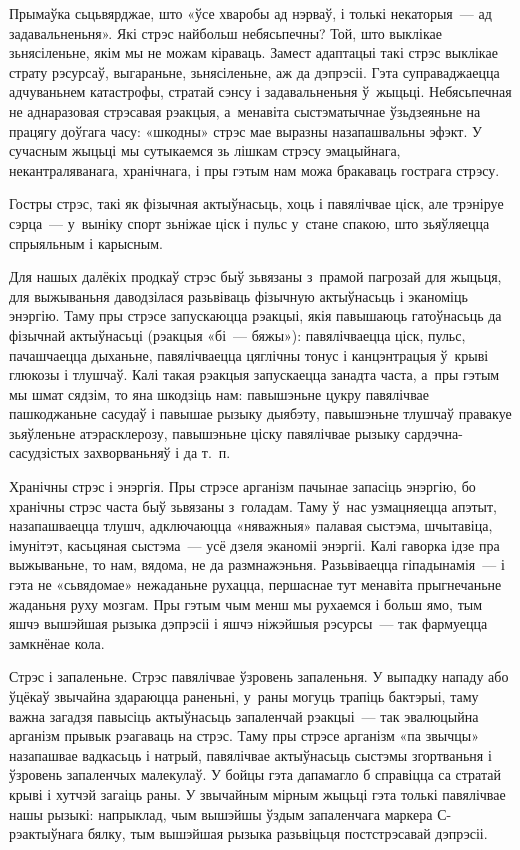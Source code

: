 Прымаўка сьцьвярджае, што «ўсе хваробы ад нэрваў, і толькі некаторыя~--- ад задавальненьня». Які стрэс найбольш небясьпечны? Той, што выклікае зьнясіленьне, якім мы не можам кіраваць. Замест адаптацыі такі стрэс выклікае страту рэсурсаў, выгараньне, зьнясіленьне, аж да дэпрэсіі. Гэта суправаджаецца адчуваньнем катастрофы, стратай сэнсу і задавальненьня ў~жыцьці. Небясьпечная не аднаразовая стрэсавая рэакцыя, а~менавіта сыстэматычнае ўзьдзеяньне на працягу доўгага часу: «шкодны» стрэс мае выразны назапашвальны эфэкт. У сучасным жыцьці мы сутыкаемся зь лішкам стрэсу эмацыйнага, некантраляванага, хранічнага, і пры гэтым нам можа бракаваць гострага стрэсу.

Гостры стрэс, такі як фізычная актыўнасьць, хоць і павялічвае ціск, але трэніруе сэрца~--- у~выніку спорт зьніжае ціск і пульс у~стане спакою, што зьяўляецца спрыяльным і карысным.

Для нашых далёкіх продкаў стрэс быў зьвязаны з~прамой пагрозай для жыцьця, для выжываньня даводзілася разьвіваць фізычную актыўнасьць і эканоміць энэргію. Таму пры стрэсе запускаюцца рэакцыі, якія павышаюць гатоўнасьць да фізычнай актыўнасьці (рэакцыя «бі~--- бяжы»): павялічваецца ціск, пульс, пачашчаецца дыханьне, павялічваецца цяглічны тонус і канцэнтрацыя ў~крыві глюкозы і тлушчаў. Калі такая рэакцыя запускаецца занадта часта, а~пры гэтым мы шмат сядзім, то яна шкодзіць нам: павышэньне цукру павялічвае пашкоджаньне сасудаў і павышае рызыку дыябэту, павышэньне тлушчаў правакуе зьяўленьне атэрасклерозу, павышэньне ціску павялічвае рызыку сардэчна-сасудзістых захворваньняў і да т.~п.

Хранічны стрэс і энэргія. Пры стрэсе арганізм пачынае запасіць энэргію, бо хранічны стрэс часта быў зьвязаны з~голадам. Таму ў~нас узмацняецца апэтыт, назапашваецца тлушч, адключаюцца «няважныя» палавая сыстэма, шчытавіца, імунітэт, касьцяная сыстэма~--- усё дзеля эканоміі энэргіі. Калі гаворка ідзе пра выжываньне, то нам, вядома, не да размнажэньня. Разьвіваецца гіпадынамія~--- і гэта не «сьвядомае» нежаданьне рухацца, першаснае тут менавіта прыгнечаньне жаданьня руху мозгам. Пры гэтым чым менш мы рухаемся і больш ямо, тым яшчэ вышэйшая рызыка дэпрэсіі і яшчэ ніжэйшыя рэсурсы~--- так фармуецца замкнёнае кола.

Стрэс і запаленьне. Стрэс павялічвае ўзровень запаленьня. У выпадку нападу або ўцёкаў звычайна здараюцца раненьні, у~раны могуць трапіць бактэрыі, таму важна загадзя павысіць актыўнасьць запаленчай рэакцыі~--- так эвалюцыйна арганізм прывык рэагаваць на стрэс. Таму пры стрэсе арганізм «па звычцы» назапашвае вадкасьць і натрый, павялічвае актыўнасьць сыстэмы згортваньня і ўзровень запаленчых малекулаў. У бойцы гэта дапамагло б справіцца са стратай крыві і хутчэй загаіць раны. У звычайным мірным жыцьці гэта толькі павялічвае нашы рызыкі: напрыклад, чым вышэйшы ўздым запаленчага маркера С-рэактыўнага бялку, тым вышэйшая рызыка разьвіцьця постстрэсавай дэпрэсіі.

